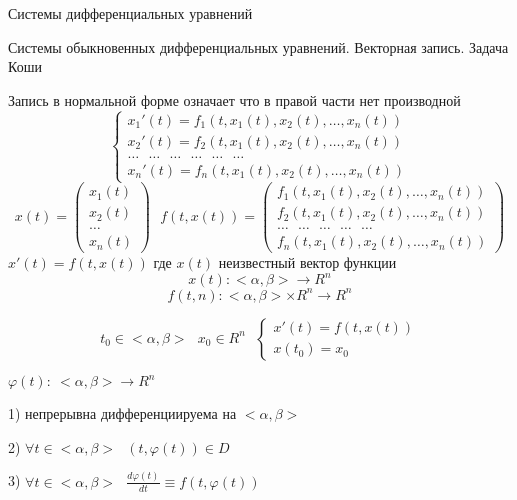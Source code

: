 \begin{title}
  Системы дифференциальных уравнений
\end{title}

\begin{title}[\Large]
  Системы обыкновенных дифференциальных уравнений. Векторная запись.
  Задача Коши
\end{title}

\begin{define}
  Запись в нормальной форме означает что в правой части нет производной
  $$
  \left\{
  \begin{array}{l}
    x_1'(t) = f_1(t, x_1(t), x_2(t), \ldots, x_n(t)) \\
    x_2'(t) = f_2(t, x_1(t), x_2(t), \ldots, x_n(t)) \\
    \ldots ~~~ \ldots ~~~ \ldots ~~~ \ldots ~~~ \ldots ~~~ \ldots \\
    x_n'(t) = f_n(t, x_1(t), x_2(t), \ldots, x_n(t))
  \end{array}
  \right.
  $$
  $$
  x(t) =
  \left(
  \begin{array}{l}
    x_1(t) \\
    x_2(t) \\
    \ldots \\
    x_n(t)
  \end{array}
  \right) ~~~
  f(t, x(t)) =
  \left(
  \begin{array}{l}
    f_1(t, x_1(t), x_2(t), \ldots, x_n(t)) \\
    f_2(t, x_1(t), x_2(t), \ldots, x_n(t)) \\
    \ldots ~~~ \ldots ~~~ \ldots ~~~ \ldots ~~~ \ldots \\
    f_n(t, x_1(t), x_2(t), \ldots, x_n(t))
  \end{array}
  \right)
  $$
  $x'(t) = f(t, x(t))$ где $x(t)$ неизвестный вектор функции
  $$
  x(t):<\alpha, \beta> \to R^n
  $$
  $$
  f(t, n): <\alpha, \beta> \times R^n \to R^n
  $$
\end{define}

\begin{block}
  $$
  t_0 \in <\alpha, \beta> ~~~ x_0 \in R^n ~~~
  \left\{
  \begin{array}{l}
    x'(t) = f(t,x(t)) \\
    x(t_0) = x_0
  \end{array}
  \right.
  $$
\end{block}

\begin{block}
  $\varphi(t): ~ <\alpha, \beta> \to R^n$

  1) непрерывна дифференциируема на $<\alpha, \beta>$

  2) $\forall t \in <\alpha, \beta> ~~~ (t, \varphi(t)) \in D$

  3) $\forall t \in <\alpha, \beta> ~~~ \frac{d\varphi(t)}{dt} \equiv
  f(t, \varphi(t))$
\end{block}

